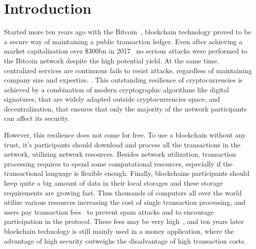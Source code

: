 \section{Introduction}
\label{sec:intro}


Started more ten years ago with the Bitcoin~\cite{nakamoto2008bitcoin}, blockchain technology proved to be a secure way of maintaining
a public transaction ledger.
Even after achieving a market capitalization over \$300bn in 2017~\cite{btcPrice}
no serious attacks were performed to the Bitcoin network despite the high potential yield.
At the same time, centralized services are continuous fails to resist attacks, regardless of maintaining company size and expertize.
.
This outstanding resilience of cryptocurrencies is achieved by a combination of modern cryptographic algorithms like digital
signatures, that are widely adapted outside cryptocurrencies space, and decentralization, that ensures that only
the majority of the network participants can affect its security.

However, this resilience does not come for free.
To use a blockchain without any trust, it's participants should download and process all the transactions in
the network, utilizing network resources.
Besides network utilization, transaction processing requires to spend some computational resources,
especially if the transactional language is flexible enough.
Finally, blockchains participants should keep quite a big amount of data in their local storages and
these storage requirements are growing fast.
Thus thousands of computers all over the world utilize various resources
increasing the cost of single transaction processing,
and users pay transaction fees~\cite{chepurnoy2018systematic} to prevent spam attacks and
to encourage participation in the protocol.
These fees may be very high~\cite{bitcoinFees},
and ten years later blockchain technology is still mainly used in a money application, where the advantage of
high security outweighs the disadvantage of high transaction costs.

